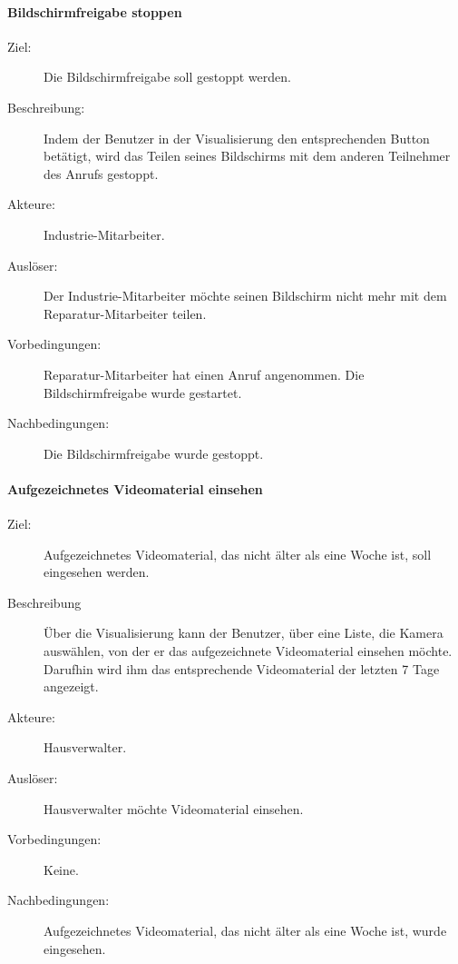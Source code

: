 \paragraph{\large{Bildschirmfreigabe stoppen}}
    \begin{description}
        \item[Ziel:] Die Bildschirmfreigabe soll gestoppt werden.
        \item[Beschreibung:] Indem der Benutzer in der Visualisierung den entsprechenden Button betätigt, wird das Teilen seines Bildschirms mit dem anderen Teilnehmer des Anrufs gestoppt.
        \item[Akteure:] Industrie-Mitarbeiter.
        \item[Auslöser:] Der Industrie-Mitarbeiter möchte seinen Bildschirm nicht mehr mit dem Reparatur-Mitarbeiter teilen.
        \item[Vorbedingungen:] Reparatur-Mitarbeiter hat einen Anruf angenommen.
            Die Bildschirmfreigabe wurde gestartet.
        \item[Nachbedingungen:] Die Bildschirmfreigabe wurde gestoppt.
    \end{description}

\paragraph{\large{Aufgezeichnetes Videomaterial einsehen}}
    \begin{description}
        \item[Ziel:] Aufgezeichnetes Videomaterial, das nicht älter als eine Woche ist, soll eingesehen werden.
        \item[Beschreibung] Über die Visualisierung kann der Benutzer, über eine Liste, die Kamera auswählen, von der er das aufgezeichnete Videomaterial einsehen möchte.
            Darufhin wird ihm das entsprechende Videomaterial der letzten 7 Tage angezeigt.
        \item[Akteure:] Hausverwalter.
        \item[Auslöser:] Hausverwalter möchte Videomaterial einsehen.
        \item[Vorbedingungen:] Keine.
        \item[Nachbedingungen:] Aufgezeichnetes Videomaterial, das nicht älter als eine Woche ist, wurde eingesehen.
    \end{description}